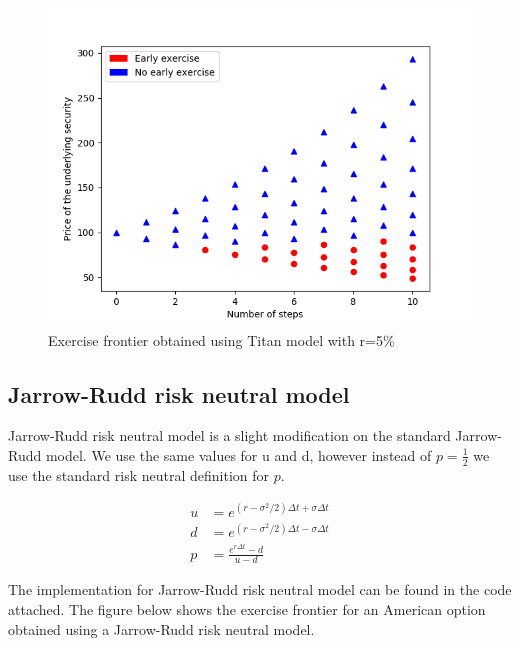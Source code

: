 \documentclass[12pt]{report}
\begin{document}
\begin{figure}[H]
	\centering
	\includegraphics[scale=0.6]{plots/Titanmodel}
	\caption{Exercise frontier obtained using Titan model with r=5\%}
\end{figure}

\subsection*{Jarrow-Rudd risk neutral model}
Jarrow-Rudd risk neutral model is a slight modification on the standard Jarrow-Rudd model. We use the same values for u and d, however instead of $p=\frac{1}{2}$ we use the standard risk neutral definition for $p$.

\begin{equation*}
	\begin{aligned}
	u &= e^{(r-\sigma^2/2)\Delta t + \sigma \Delta t} \\
	d &= e^{(r-\sigma^2/2)\Delta t - \sigma \Delta t} \\
	p &= \frac{e^{r\Delta t} -d }{u-d}
	\end{aligned}
\end{equation*}

The implementation for Jarrow-Rudd risk neutral model can be found in the code attached. The figure below shows the exercise frontier for an American option obtained using a Jarrow-Rudd risk neutral model.
\end{document}
